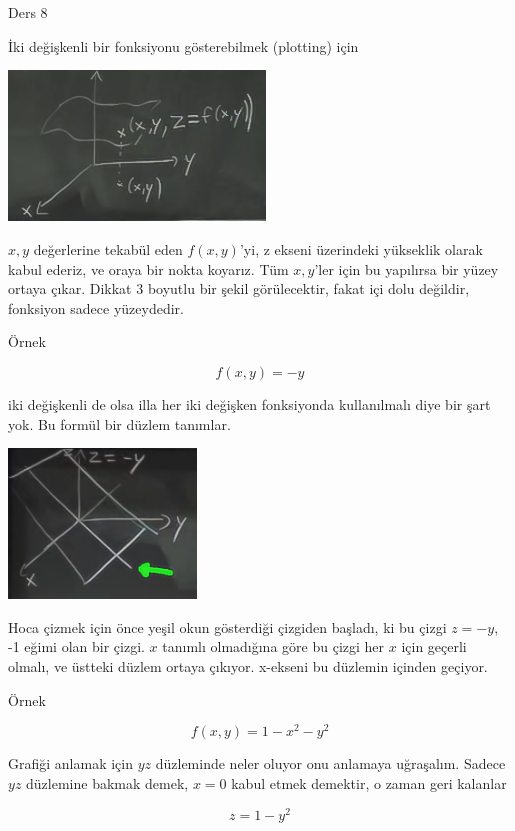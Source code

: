 \documentclass[12pt,fleqn]{article}\usepackage{../../common}
\begin{document}
Ders 8

İki değişkenli bir fonksiyonu gösterebilmek (plotting) için 

\begin{center}
\includegraphics[height=4cm]{8_1.png}
\end{center}

$x,y$ değerlerine tekabül eden $f(x,y)$'yi, z ekseni üzerindeki yükseklik olarak
kabul ederiz, ve oraya bir nokta koyarız. Tüm $x,y$'ler için bu yapılırsa bir
yüzey ortaya çıkar. Dikkat 3 boyutlu bir şekil görülecektir, fakat içi dolu
değildir, fonksiyon sadece yüzeydedir.

Örnek

$$ f(x,y) = -y $$

iki değişkenli de olsa illa her iki değişken fonksiyonda kullanılmalı diye
bir şart yok. Bu formül bir düzlem tanımlar. 

\begin{center}
\includegraphics[height=4cm]{8_2.png}
\end{center}

Hoca çizmek için önce yeşil okun gösterdiği çizgiden başladı, ki bu çizgi
$z=-y$, -1 eğimi olan bir çizgi. $x$ tanımlı olmadığına göre bu çizgi her $x$
için geçerli olmalı, ve üstteki düzlem ortaya çıkıyor. x-ekseni bu düzlemin
içinden geçiyor.

Örnek 

$$ f(x,y) = 1-x^2-y^2 $$

Grafiği anlamak için $yz$ düzleminde neler oluyor onu anlamaya
uğraşalım. Sadece $yz$ düzlemine bakmak demek, $x=0$ kabul etmek demektir,
o zaman geri kalanlar 

$$ z = 1-y^2 $$
\end{document}
